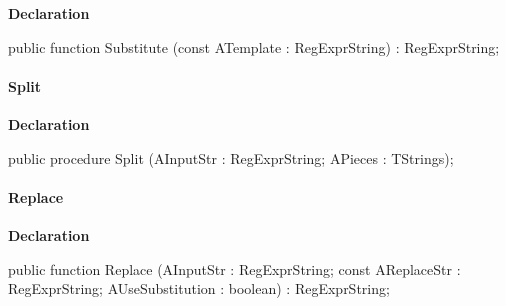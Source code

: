 \documentclass{report}
\newif\ifpdf
\begin{document}
\label{RegExpr.TRegExpr-Substitute}
\begin{list}{}{
\setlength{\itemindent}{0cm}
\setlength{\listparindent}{0cm}
\setlength{\leftmargin}{\evensidemargin}
\addtolength{\leftmargin}{\tmplength}
\settowidth{\labelsep}{X}
\addtolength{\leftmargin}{\labelsep}
\setlength{\labelwidth}{\tmplength}
}
\item[\textbf{Declaration}\hfill]
\ifpdf
\begin{flushleft}
\fi
\begin{ttfamily}
public function Substitute (const ATemplate : RegExprString) : RegExprString;\end{ttfamily}

\ifpdf
\end{flushleft}
\fi

\end{list}
\paragraph*{Split}\hspace*{\fill}

\label{RegExpr.TRegExpr-Split}
\begin{list}{}{
\setlength{\itemindent}{0cm}
\setlength{\listparindent}{0cm}
\setlength{\leftmargin}{\evensidemargin}
\addtolength{\leftmargin}{\tmplength}
\settowidth{\labelsep}{X}
\addtolength{\leftmargin}{\labelsep}
\setlength{\labelwidth}{\tmplength}
}
\item[\textbf{Declaration}\hfill]
\ifpdf
\begin{flushleft}
\fi
\begin{ttfamily}
public procedure Split (AInputStr : RegExprString; APieces : TStrings);\end{ttfamily}

\ifpdf
\end{flushleft}
\fi

\end{list}
\paragraph*{Replace}\hspace*{\fill}

\label{RegExpr.TRegExpr-Replace}
\begin{list}{}{
\setlength{\itemindent}{0cm}
\setlength{\listparindent}{0cm}
\setlength{\leftmargin}{\evensidemargin}
\addtolength{\leftmargin}{\tmplength}
\settowidth{\labelsep}{X}
\addtolength{\leftmargin}{\labelsep}
\setlength{\labelwidth}{\tmplength}
}
\item[\textbf{Declaration}\hfill]
\ifpdf
\begin{flushleft}
\fi
\begin{ttfamily}
public function Replace (AInputStr : RegExprString; const AReplaceStr : RegExprString; AUseSubstitution : boolean) : RegExprString;\end{ttfamily}

\ifpdf
\end{flushleft}
\fi

\end{list}
\end{document}
